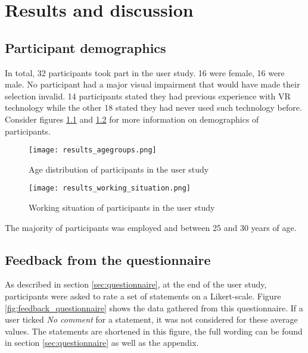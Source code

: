 \chapter{Results and discussion}
\label{sec:results_and_discussion}

	\section{Participant demographics}
	\label{sec:participant_demographics}

In total, 32 participants took part in the user study. 16 were female, 16 were male. No participant had a major visual impairment that would have made their selection invalid. 14 participants stated they had previous experience with VR technology while the other 18 stated they had never used such technology before. Consider figures \ref{fig:results_agegroups} and \ref{fig:results_working_situation} for more information on demographics of participants.

\begin{figure}[h]
	\centering
	\texttt{[image: results\_agegroups.png]}\\ %
	\caption{Age distribution of participants in the user study}
	\label{fig:results_agegroups}
\end{figure}

\begin{figure}[h]
	\centering
	\texttt{[image: results\_working\_situation.png]}\\ %
	\caption{Working situation of participants in the user study}
	\label{fig:results_working_situation}
\end{figure}

The majority of participants was employed and between 25 and 30 years of age.

	\section{Feedback from the questionnaire}
	\label{sec:results_feedback_from_questionnaire}

As described in section \ref{sec:questionnaire}, at the end of the user study, participants were asked to rate a set of statements on a Likert-scale. Figure \ref{fig:feedback_questionnaire} shows the data gathered from this questionnaire. If a user ticked \textit{No comment} for a statement, it was not considered for these average values. The statements are shortened in this figure, the full wording can be found in section \ref{sec:questionnaire} as well as the appendix.


